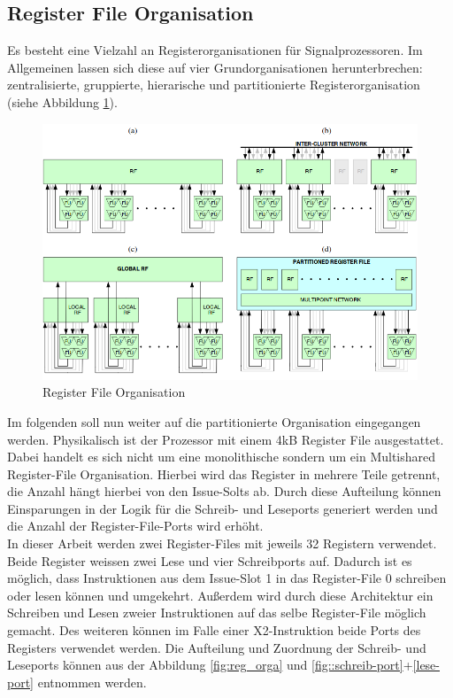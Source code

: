 \subsection{Register File Organisation}
Es besteht eine Vielzahl an Registerorganisationen für Signalprozessoren. Im Allgemeinen lassen sich diese auf vier Grundorganisationen herunterbrechen: zentralisierte, gruppierte, hierarische und partitionierte Registerorganisation (siehe Abbildung \ref{fig:RegisterOrga}).\newline
\begin{figure}[htbp] 
	\centering
	\includegraphics[width=\textwidth]{fig/Register_orga.png}
	\caption{Register File Organisation  \cite{paya2010multi}}
	\label{fig:RegisterOrga}
\end{figure}
Im folgenden soll nun weiter auf die partitionierte Organisation eingegangen werden. Physikalisch ist der Prozessor mit einem 4kB Register File ausgestattet. Dabei handelt es sich nicht um eine monolithische sondern um ein Multishared Register-File Organisation. Hierbei wird das Register in mehrere Teile getrennt, die Anzahl hängt hierbei von den Issue-Solts ab. Durch diese Aufteilung können Einsparungen in der Logik für die Schreib- und Leseports generiert werden und die Anzahl der Register-File-Ports wird erhöht.\\
In dieser Arbeit werden zwei Register-Files mit jeweils 32 Registern verwendet. Beide Register weissen zwei Lese und vier Schreibports auf. Dadurch ist es möglich, dass Instruktionen aus dem Issue-Slot 1 in das Register-File 0 schreiben oder lesen können und umgekehrt. Außerdem wird durch diese Architektur ein Schreiben und Lesen zweier Instruktionen auf das selbe Register-File möglich gemacht. Des weiteren können im Falle einer X2-Instruktion beide Ports des Registers verwendet werden. Die Aufteilung und  Zuordnung der Schreib- und Leseports können aus der Abbildung \ref{fig:reg_orga} und \autoref{fig::schreib-port}+\ref{lese-port} entnommen werden.

